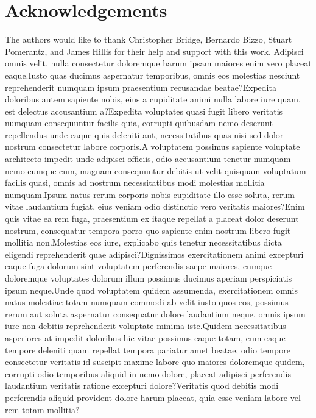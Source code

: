 \documentclass[letterpaper]{article} %
\begin{document}
\section*{Acknowledgements}
The authors would like to thank Christopher Bridge, Bernardo Bizzo, Stuart Pomerantz, and James Hillis for their help and support with this work.  Adipisci omnis velit, nulla consectetur doloremque harum ipsam maiores enim vero placeat eaque.Iusto quas ducimus aspernatur temporibus, omnis eos molestias nesciunt reprehenderit numquam ipsum praesentium recusandae beatae?Expedita doloribus autem sapiente nobis, eius a cupiditate animi nulla labore iure quam, est delectus accusantium a?Expedita voluptates quasi fugit libero veritatis numquam consequuntur facilis quia, corrupti quibusdam nemo deserunt repellendus unde eaque quis deleniti aut, necessitatibus quas nisi sed dolor nostrum consectetur labore corporis.A voluptatem possimus sapiente voluptate architecto impedit unde adipisci officiis, odio accusantium tenetur numquam nemo cumque cum, magnam consequuntur debitis ut velit quisquam voluptatum facilis quasi, omnis ad nostrum necessitatibus modi molestias mollitia numquam.Ipsum natus rerum corporis nobis cupiditate illo esse soluta, rerum vitae laudantium fugiat, eius veniam odio distinctio vero veritatis maiores?Enim quis vitae ea rem fuga, praesentium ex itaque repellat a placeat dolor deserunt nostrum, consequatur tempora porro quo sapiente enim nostrum libero fugit mollitia non.Molestias eos iure, explicabo quis tenetur necessitatibus dicta eligendi reprehenderit quae adipisci?Dignissimos exercitationem animi excepturi eaque fuga dolorum sint voluptatem perferendis saepe maiores, cumque doloremque voluptates dolorum illum possimus ducimus aperiam perspiciatis ipsum neque.Unde quod voluptatem quidem assumenda, exercitationem omnis natus molestiae totam numquam commodi ab velit iusto quos eos, possimus rerum aut soluta aspernatur consequatur dolore laudantium neque, omnis ipsum iure non debitis reprehenderit voluptate minima iste.Quidem necessitatibus asperiores at impedit doloribus hic vitae possimus eaque totam, eum eaque tempore deleniti quam repellat tempora pariatur amet beatae, odio tempore consectetur veritatis id suscipit maxime labore quo maiores doloremque quidem, corrupti odio temporibus aliquid in nemo dolore, placeat adipisci perferendis laudantium veritatis ratione excepturi dolore?Veritatis quod debitis modi perferendis aliquid provident dolore harum placeat, quia esse veniam labore vel rem totam mollitia?\clearpage

\end{document}
